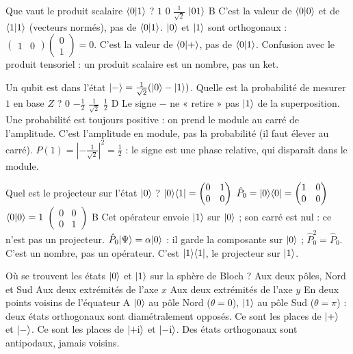   {Que vaut le produit scalaire $\langle 0|1\rangle$ ?}
  {$1$}
  {$0$}
  {$\frac{1}{\sqrt2}$}
  {$|01\rangle$}
  {B}
\qcmx
  {C'est la valeur de $\langle 0|0\rangle$ et de $\langle 1|1\rangle$ (vecteurs normés), pas de $\langle 0|1\rangle$.}
  {$|0\rangle$ et $|1\rangle$ sont orthogonaux : $\begin{pmatrix}1&0\end{pmatrix}\begin{pmatrix}0\\1\end{pmatrix}=0$.}
  {C'est la valeur de $\langle 0|+\rangle$, pas de $\langle 0|1\rangle$.}
  {Confusion avec le produit tensoriel : un produit scalaire est un nombre, pas un ket.}

  {Un qubit est dans l'état $|-\rangle=\frac{1}{\sqrt2}(|0\rangle-|1\rangle)$. Quelle est la probabilité de mesurer $1$ en base $Z$ ?}
  {$0$}
  {$-\frac12$}
  {$\frac{1}{\sqrt2}$}
  {$\frac12$}
  {D}
\qcmx
  {Le signe $-$ ne « retire » pas $|1\rangle$ de la superposition.}
  {Une probabilité est toujours positive : on prend le module au carré de l'amplitude.}
  {C'est l'amplitude en module, pas la probabilité (il faut élever au carré).}
  {$P(1)=\left|-\frac{1}{\sqrt2}\right|^2=\frac12$ : le signe est une phase relative, qui disparaît dans le module.}

  {Quel est le projecteur sur l'état $|0\rangle$ ?}
  {$|0\rangle\langle 1|=\begin{pmatrix}0&1\\0&0\end{pmatrix}$}
  {$\hat P_0=|0\rangle\langle 0|=\begin{pmatrix}1&0\\0&0\end{pmatrix}$}
  {$\langle 0|0\rangle=1$}
  {$\begin{pmatrix}0&0\\0&1\end{pmatrix}$}
  {B}
\qcmx
  {Cet opérateur envoie $|1\rangle$ sur $|0\rangle$ ; son carré est nul : ce n'est pas un projecteur.}
  {$\hat P_0|\Psi\rangle=\alpha|0\rangle$ : il garde la composante sur $|0\rangle$ ; $\hat P_0^2=\hat P_0$.}
  {C'est un nombre, pas un opérateur.}
  {C'est $|1\rangle\langle 1|$, le projecteur sur $|1\rangle$.}

  {Où se trouvent les états $|0\rangle$ et $|1\rangle$ sur la sphère de Bloch ?}
  {Aux deux pôles, Nord et Sud}
  {Aux deux extrémités de l'axe $x$}
  {Aux deux extrémités de l'axe $y$}
  {En deux points voisins de l'équateur}
  {A}
\qcmx
  {$|0\rangle$ au pôle Nord ($\theta=0$), $|1\rangle$ au pôle Sud ($\theta=\pi$) : deux états orthogonaux sont diamétralement opposés.}
  {Ce sont les places de $|+\rangle$ et $|-\rangle$.}
  {Ce sont les places de $|{+}\mathrm{i}\rangle$ et $|{-}\mathrm{i}\rangle$.}
  {Des états orthogonaux sont antipodaux, jamais voisins.}

